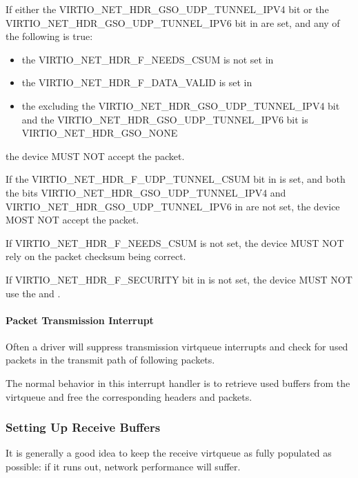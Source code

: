 If either the VIRTIO_NET_HDR_GSO_UDP_TUNNEL_IPV4 bit or
the VIRTIO_NET_HDR_GSO_UDP_TUNNEL_IPV6 bit in  are set, and any of
the following is true:
\begin{itemize}
\item the VIRTIO_NET_HDR_F_NEEDS_CSUM is not set in 
\item the VIRTIO_NET_HDR_F_DATA_VALID is set in 
\item the  excluding the VIRTIO_NET_HDR_GSO_UDP_TUNNEL_IPV4
bit and the VIRTIO_NET_HDR_GSO_UDP_TUNNEL_IPV6 bit is VIRTIO_NET_HDR_GSO_NONE
\end{itemize}
the device MUST NOT accept the packet.

If the VIRTIO_NET_HDR_F_UDP_TUNNEL_CSUM bit in  is set,
and both the bits VIRTIO_NET_HDR_GSO_UDP_TUNNEL_IPV4 and
VIRTIO_NET_HDR_GSO_UDP_TUNNEL_IPV6 in  are not set,
the device MOST NOT accept the packet.

If VIRTIO_NET_HDR_F_NEEDS_CSUM is not set, the device MUST NOT
rely on the packet checksum being correct.

If VIRTIO_NET_HDR_F_SECURITY bit in  is not set, the
device MUST NOT use the  and .

\paragraph{Packet Transmission Interrupt}\label{sec:Device Types / Network Device / Device Operation / Packet Transmission / Packet Transmission Interrupt}

Often a driver will suppress transmission virtqueue interrupts
and check for used packets in the transmit path of following
packets.

The normal behavior in this interrupt handler is to retrieve
used buffers from the virtqueue and free the corresponding
headers and packets.

\subsubsection{Setting Up Receive Buffers}\label{sec:Device Types / Network Device / Device Operation / Setting Up Receive Buffers}

It is generally a good idea to keep the receive virtqueue as
fully populated as possible: if it runs out, network performance
will suffer.

